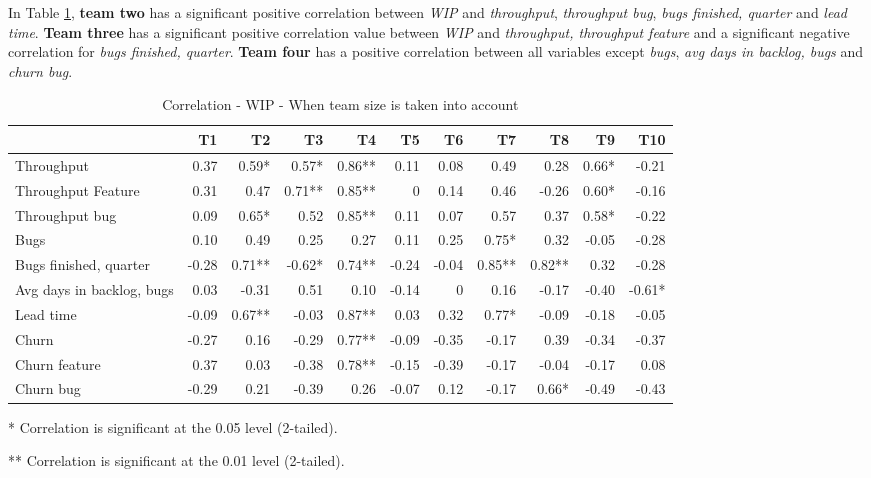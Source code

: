\documentclass[UKenglish]{ifimaster}  %
\begin{document}
In Table \ref{corr:WIP:V2}, \textbf{team two} has a significant positive correlation between \textit{WIP} and \textit{throughput}, \textit{throughput bug},  \textit{bugs finished, quarter} and \textit{lead time}. \textbf{Team three} has a significant positive correlation value between \textit{WIP} and \textit{throughput, throughput feature} and a significant negative correlation for \textit{bugs finished, quarter}. \textbf{Team four} has a positive correlation between all variables except \textit{bugs}, \textit{avg days in backlog, bugs} and \textit{churn bug}. 



\begin{table}[H]
  \begin{adjustwidth}{-1.5cm}{}
 \center
  \captionsetup{justification=centering}
 \begin{tabular}{|l|r|r|r|r|r|r|r|r|r|r|}
\hline
 &  \bf{T1} & \bf{T2} & \bf{T3} & \bf{T4} & \bf{T5} & \bf{T6} & \bf{T7} & \bf{T8} & \bf{T9} & \bf{T10}\\ \hline
 Throughput  & 0.37 & 0.59* & 0.57* & 0.86** & 0.11 & 0.08 & 0.49 & 0.28 & 0.66* & -0.21 \\ \hline
 Throughput Feature  & 0.31 & 0.47 & 0.71** & 0.85** & 0 &0.14 & 0.46 & -0.26 & 0.60* & -0.16 \\ \hline
 Throughput bug  & 0.09 & 0.65* & 0.52 & 0.85** & 0.11 & 0.07 & 0.57 & 0.37 & 0.58* & -0.22 \\ \hline
 Bugs  & 0.10 & 0.49 & 0.25 & 0.27 & 0.11 & 0.25 & 0.75* & 0.32 & -0.05 & -0.28 \\ \hline
 Bugs finished, quarter  & -0.28 & 0.71** & -0.62* & 0.74** & -0.24 & -0.04 & 0.85** & 0.82** & 0.32 & -0.28 \\ \hline
 Avg days in backlog, bugs  & 0.03 & -0.31 & 0.51 & 0.10 & -0.14 & 0 &0.16 & -0.17 & -0.40 & -0.61* \\ \hline
 Lead time  & -0.09 & 0.67** & -0.03 & 0.87** & 0.03 & 0.32 & 0.77* & -0.09 & -0.18 & -0.05 \\ \hline
 Churn  & -0.27 & 0.16 & -0.29 & 0.77** & -0.09 & -0.35 & -0.17 & 0.39 & -0.34 & -0.37 \\ \hline
 Churn feature  & 0.37 & 0.03 & -0.38 & 0.78** & -0.15 & -0.39 & -0.17 & -0.04 & -0.17 & 0.08 \\ \hline
 Churn bug  & -0.29 & 0.21 & -0.39 & 0.26 & -0.07 & 0.12 & -0.17 & 0.66* & -0.49 & -0.43 \\ \hline
\end{tabular}
 \caption{Correlation - WIP - When team size is taken into account}
 \label{corr:WIP:V2}
 \centerline {* Correlation is significant at the 0.05 level (2-tailed).}
\centerline{** Correlation is significant at the 0.01 level (2-tailed).}
\end{adjustwidth}
\end{table}
\end{document}
